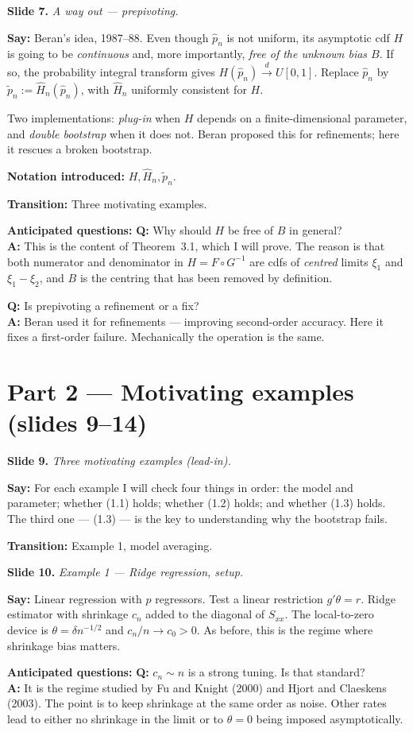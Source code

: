 \documentclass[11pt]{article}
\theoremstyle{definition}
\newcommand{\dto}{\xrightarrow{d}}
\newcommand{\pnh}{\hat{p}_{n}}
\newcommand{\pnt}{\tilde{p}_{n}}
\newcommand{\Hnh}{\hat{H}_{n}}
\newcommand{\slide}[2]{%
  \medskip
  \noindent\colorbox{soft}{\parbox{\linewidth}{\textbf{Slide #1.} \textit{#2}}}
  \medskip
}
\newcommand{\say}[1]{\textbf{Say:} #1}
\newcommand{\trans}[1]{\textbf{Transition:} #1}
\newcommand{\Q}[2]{\noindent\textcolor{warn}{\textbf{Q:}} #1\\ \textcolor{accent}{\textbf{A:}} #2\par\smallskip}
\begin{document}
\slide{7}{A way out --- prepivoting.}
\say{Beran's idea, 1987--88. Even though $\pnh$ is not uniform, its
asymptotic cdf $H$ is going to be \emph{continuous} and, more importantly,
\emph{free of the unknown bias $B$}. If so, the probability integral transform
gives $H(\pnh)\dto U[0,1]$. Replace $\pnh$ by $\pnt:=\Hnh(\pnh)$, with $\Hnh$
uniformly consistent for $H$.

Two implementations: \emph{plug-in} when $H$ depends on a finite-dimensional
parameter, and \emph{double bootstrap} when it does not. Beran proposed this
for refinements; here it rescues a broken bootstrap.}

\textbf{Notation introduced:} $H,\Hnh,\pnt$.

\trans{Three motivating examples.}

\textbf{Anticipated questions:}
\Q{Why should $H$ be free of $B$ in general?}
{This is the content of Theorem~3.1, which I will prove. The reason is that
both numerator and denominator in $H=F\circ G^{-1}$ are cdfs of \emph{centred}
limits $\xi_1$ and $\xi_1-\xi_2$, and $B$ is the centring that has been
removed by definition.}
\Q{Is prepivoting a refinement or a fix?}
{Beran used it for refinements --- improving second-order accuracy. Here it
fixes a first-order failure. Mechanically the operation is the same.}

\section{Part 2 --- Motivating examples (slides 9--14)}

\slide{9}{Three motivating examples (lead-in).}
\say{For each example I will check four things in order: the model and
parameter; whether (1.1) holds; whether (1.2) holds; and whether (1.3) holds.
The third one --- (1.3) --- is the key to understanding why the bootstrap
fails.}

\trans{Example 1, model averaging.}

\slide{10}{Example 1 --- Ridge regression, setup.}
\say{Linear regression with $p$ regressors. Test a linear restriction
$g'\theta=r$. Ridge estimator with shrinkage $c_n$ added to the diagonal
of $S_{xx}$. The local-to-zero device is $\theta=\delta n^{-1/2}$ and
$c_n/n\to c_0>0$. As before, this is the regime where shrinkage bias
matters.}

\textbf{Anticipated questions:}
\Q{$c_n\sim n$ is a strong tuning. Is that standard?}
{It is the regime studied by Fu and Knight (2000) and Hjort and
Claeskens (2003). The point is to keep shrinkage at the same order as noise.
Other rates lead to either no shrinkage in the limit or to $\theta=0$ being
imposed asymptotically.}
\end{document}

